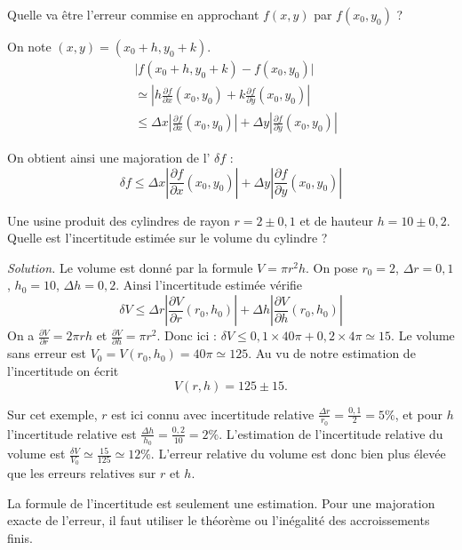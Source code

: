 \documentclass[12pt, class=report,crop=false]{standalone}
\begin{document}
Quelle va être l'erreur commise en approchant $f(x,y)$ par $f(x_0,y_0)$ ?



On note $(x,y) = (x_0+h,y_0+k)$.
\begin{align*}
  &\big| f(x_0+h,y_0+k) - f(x_0,y_0) \big| \\
  & \simeq \left| h\frac{\partial f}{\partial x}(x_0,y_0)
+k\frac{\partial f}{\partial y}(x_0,y_0) \right| \\
  & \le \Delta x \left|\frac{\partial f}{\partial x}(x_0,y_0) \right| 
+ \Delta y \left|\frac{\partial f}{\partial y}(x_0,y_0) \right| 
\end{align*}


On obtient ainsi une majoration de l' $\delta f$ :
$$\delta f \le \Delta x \left|\frac{\partial f}{\partial x}(x_0,y_0) \right| 
+ \Delta y \left|\frac{\partial f}{\partial y}(x_0,y_0) \right|$$


\begin{exemple}
Une usine produit des cylindres de rayon $r = 2 \pm 0,1$ et de hauteur $h = 10 \pm 0,2$. Quelle est l'incertitude estimée sur le volume du cylindre ?

\bigskip

\emph{Solution.}
Le volume est donné par la formule $V = \pi r^2 h$.
On pose $r_0 = 2$, $\Delta r = 0,1$, $h_0 = 10$, $\Delta h = 0,2$.
Ainsi l'incertitude estimée vérifie
$$\delta V \le \Delta r\left|\frac{\partial V}{\partial r}(r_0,h_0) \right| + \Delta h\left|\frac{\partial V}{\partial h} (r_0,h_0)\right| $$
On a 
$\frac{\partial V}{\partial r} = 2\pi r h$ 
et $\frac{\partial V}{\partial h} = \pi r^2$.
Donc ici :
$\delta V \le 0,1 \times 40\pi + 0,2 \times 4 \pi \simeq 15$.   
Le volume sans erreur est $V_0 = V(r_0,h_0) = 40 \pi \simeq 125$.
Au vu de notre estimation de l'incertitude on écrit 
$$V(r,h) = 125 \pm 15.$$

\end{exemple}

\begin{remarque*}
Sur cet exemple, $r$ est ici connu avec incertitude relative 
$\frac{\Delta r}{r_0} = \frac{0,1}{2} = 5\%$, et pour 
$h$ l'incertitude relative est $\frac{\Delta h}{h_0} = \frac{0,2}{10} = 2\%$.
L'estimation de l'incertitude relative du volume est 
$\frac{\delta V}{V_0} \simeq  \frac{15}{125} \simeq 12 \%$.
L'erreur relative du volume est donc bien plus élevée que les erreurs relatives sur $r$ et $h$.
\end{remarque*}

\begin{remarque*}
La formule de l'incertitude est seulement une estimation.
Pour une majoration exacte de l'erreur, il faut utiliser le théorème ou l'inégalité des accroissements finis.
\end{remarque*}
\end{document}
